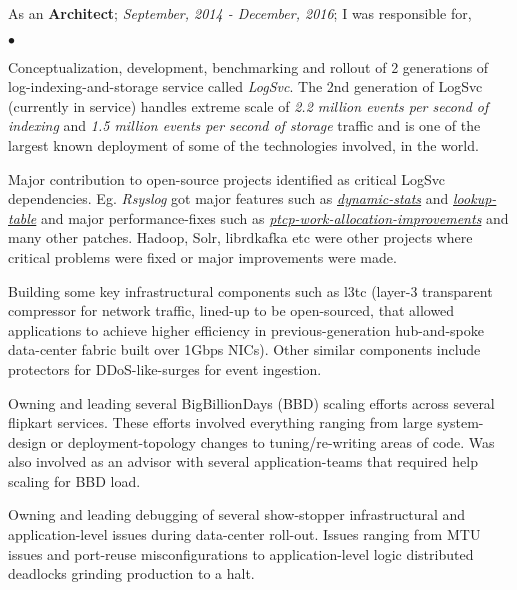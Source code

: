 \documentclass[margin,line]{res}
\newenvironment{list2}{
  \begin{list}{$\bullet$}{%
      \setlength{\itemsep}{0in}
      \setlength{\parsep}{0in} \setlength{\parskip}{0in}
      \setlength{\topsep}{0in} \setlength{\partopsep}{0in} 
      \setlength{\leftmargin}{0.2in}}}{\end{list}}
\begin{document}
\begin{resume}
As an {\bf Architect}; {\em September, 2014 - December, 2016}; I was responsible for,\\
\begin{list2}
\item Conceptualization, development, benchmarking and rollout of 2 generations of log-indexing-and-storage service called {\em LogSvc}. The 2nd generation of LogSvc (currently in service) handles extreme scale of {\em 2.2 million events per second of indexing} and {\em 1.5 million events per second of storage} traffic and is one of the largest known deployment of some of the technologies involved, in the world.
\item Major contribution to open-source projects identified as critical LogSvc dependencies. Eg. {\em Rsyslog} got major features such as \href{https://github.com/rsyslog/rsyslog/pull/614}{\em dynamic-stats} and \href{https://github.com/rsyslog/rsyslog/pull/578}{\em lookup-table} and major performance-fixes such as \href{https://github.com/rsyslog/rsyslog/pull/567}{\em ptcp-work-allocation-improvements} and many other patches. Hadoop, Solr, librdkafka etc were other projects where critical problems were fixed or major improvements were made.
\item Building some key infrastructural components such as l3tc (layer-3 transparent compressor for network traffic, lined-up to be open-sourced, that allowed applications to achieve higher efficiency in previous-generation hub-and-spoke data-center fabric built over 1Gbps NICs). Other similar components include protectors for DDoS-like-surges for event ingestion.
\item Owning and leading several BigBillionDays (BBD) scaling efforts across several flipkart services. These efforts involved everything ranging from large system-design or deployment-topology changes to tuning/re-writing areas of code. Was also involved as an advisor with several application-teams that required help scaling for BBD load.
\item Owning and leading debugging of several show-stopper infrastructural and application-level issues during data-center roll-out. Issues ranging from MTU issues and port-reuse misconfigurations to application-level logic distributed deadlocks grinding production to a halt.
\end{list2}


\end{resume}
\end{document}
